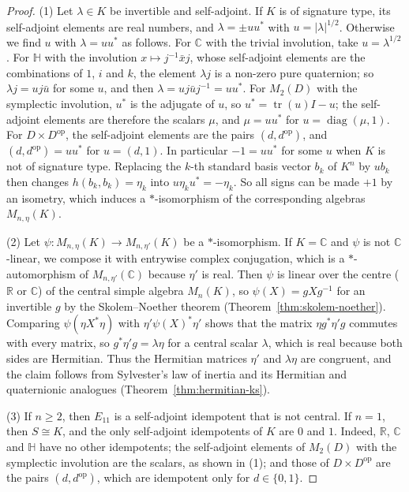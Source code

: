 \documentclass[12pt, a4paper]{report}
\theoremstyle{plain}
\theoremstyle{definition}
\theoremstyle{remark}
\theoremstyle{plain}
\newcommand{\RR}{\mathbb{R}}
\newcommand{\CC}{\mathbb{C}}
\newcommand{\HH}{\mathbb{H}}
\newcommand{\tr}{\operatorname{tr}}
\DeclareMathOperator{\diag}{diag}
\begin{document}
\begin{proof}
(1) Let $\lambda\in K$ be invertible and self-adjoint. If $K$ is of signature type, its self-adjoint elements are real numbers, and $\lambda=\pm uu^*$ with $u=|\lambda|^{1/2}$. Otherwise we find $u$ with $\lambda=uu^*$ as follows. For $\CC$ with the trivial involution, take $u=\lambda^{1/2}$. For $\HH$ with the involution $x\mapsto j^{-1}\bar xj$, whose self-adjoint elements are the combinations of $1$, $i$ and $k$, the element $\lambda j$ is a non-zero pure quaternion; so $\lambda j=uj\bar u$ for some $u$, and then $\lambda=uj\bar uj^{-1}=uu^*$. For $M_2(D)$ with the symplectic involution, $u^*$ is the adjugate of $u$, so $u^*=\tr(u)I-u$; the self-adjoint elements are therefore the scalars $\mu$, and $\mu=uu^*$ for $u=\diag(\mu,1)$. For $D\times D^{\mathrm{op}}$, the self-adjoint elements are the pairs $(d,d^{\mathrm{op}})$, and $(d,d^{\mathrm{op}})=uu^*$ for $u=(d,1)$. In particular $-1=uu^*$ for some $u$ when $K$ is not of signature type. Replacing the $k$-th standard basis vector $b_k$ of $K^n$ by $ub_k$ then changes $h(b_k,b_k)=\eta_k$ into $u\eta_ku^*=-\eta_k$. So all signs can be made $+1$ by an isometry, which induces a $*$-isomorphism of the corresponding algebras $M_{n,\eta}(K)$.

(2) Let $\psi:M_{n,\eta}(K)\to M_{n,\eta'}(K)$ be a $*$-isomorphism. If $K=\CC$ and $\psi$ is not $\CC$-linear, we compose it with entrywise complex conjugation, which is a $*$-automorphism of $M_{n,\eta'}(\CC)$ because $\eta'$ is real. Then $\psi$ is linear over the centre ($\RR$ or $\CC$) of the central simple algebra $M_n(K)$, so $\psi(X)=gXg^{-1}$ for an invertible $g$ by the Skolem--Noether theorem (Theorem~\ref{thm:skolem-noether}). Comparing $\psi(\eta X^*\eta)$ with $\eta'\psi(X)^*\eta'$ shows that the matrix $\eta g^*\eta'g$ commutes with every matrix, so $g^*\eta'g=\lambda\eta$ for a central scalar $\lambda$, which is real because both sides are Hermitian. Thus the Hermitian matrices $\eta'$ and $\lambda\eta$ are congruent, and the claim follows from Sylvester's law of inertia and its Hermitian and quaternionic analogues (Theorem~\ref{thm:hermitian-ks}).

(3) If $n\geq2$, then $E_{11}$ is a self-adjoint idempotent that is not central. If $n=1$, then $S\cong K$, and the only self-adjoint idempotents of $K$ are $0$ and $1$. Indeed, $\RR$, $\CC$ and $\HH$ have no other idempotents; the self-adjoint elements of $M_2(D)$ with the symplectic involution are the scalars, as shown in (1); and those of $D\times D^{\mathrm{op}}$ are the pairs $(d,d^{\mathrm{op}})$, which are idempotent only for $d\in\{0,1\}$.
\end{proof}
\end{document}
